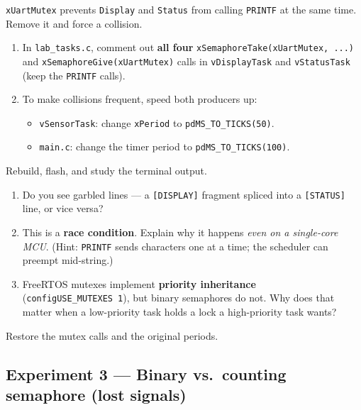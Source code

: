 \documentclass[11pt, a4paper]{article}
\newcommand{\file}[1]{\texttt{\small #1}}
\newcommand{\api}[1]{\texttt{\small #1}}
\begin{document}
\api{xUartMutex} prevents \texttt{Display} and \texttt{Status} from calling
\api{PRINTF} at the same time.  Remove it and force a collision.

\begin{enumerate}[noitemsep, leftmargin=*]
  \item In \file{lab\_tasks.c}, comment out \textbf{all four}
        \api{xSemaphoreTake(xUartMutex, ...)} and \api{xSemaphoreGive(xUartMutex)}
        calls in \texttt{vDisplayTask} and \texttt{vStatusTask}
        (keep the \api{PRINTF} calls).
  \item To make collisions frequent, speed both producers up:
        \begin{itemize}[noitemsep]
          \item \texttt{vSensorTask}: change \texttt{xPeriod} to
                \api{pdMS\_TO\_TICKS(50)}.
          \item \file{main.c}: change the timer period to \api{pdMS\_TO\_TICKS(100)}.
        \end{itemize}
\end{enumerate}

Rebuild, flash, and study the terminal output.

\begin{questionbox}[~2]
  \begin{enumerate}[label=(\alph*), noitemsep, leftmargin=*]
    \item Do you see garbled lines --- a \texttt{[DISPLAY]} fragment spliced into
          a \texttt{[STATUS]} line, or vice versa?
    \item This is a \textbf{race condition}.  Explain why it happens \emph{even on a
          single-core MCU}.  (Hint: \api{PRINTF} sends characters one at a time;
          the scheduler can preempt mid-string.)
    \item FreeRTOS mutexes implement \textbf{priority inheritance}
          (\texttt{configUSE\_MUTEXES~1}), but binary semaphores do not.  Why does
          that matter when a low-priority task holds a lock a high-priority task wants?
  \end{enumerate}
\end{questionbox}

Restore the mutex calls and the original periods.

\subsection{Experiment 3 --- Binary vs.\ counting semaphore (lost signals)}
\end{document}
